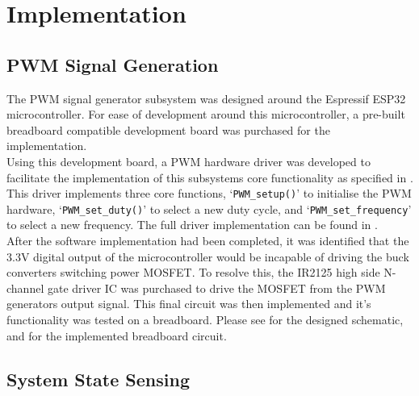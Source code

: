 \chapter{Implementation}\label{C:implementation}


\section{PWM Signal Generation}\label{S:pwm_gen_impl}

The PWM signal generator subsystem was designed around the Espressif ESP32 microcontroller. For ease of development around this microcontroller, a pre-built breadboard compatible development board was purchased for the implementation. \\

Using this development board, a PWM hardware driver was developed to facilitate the implementation of this subsystems core functionality as specified in . This driver implements three core functions, `\lstinline{PWM_setup()}' to initialise the PWM hardware, `\lstinline{PWM_set_duty()}' to select a new duty cycle, and `\lstinline{PWM_set_frequency}' to select a new frequency. The full driver implementation can be found in .\\

After the software implementation had been completed, it was identified that the 3.3V digital output of the microcontroller would be incapable of driving the buck converters switching power MOSFET. To resolve this, the IR2125 high side N-channel gate driver IC was purchased to drive the MOSFET from the PWM generators output signal. This final circuit was then implemented and it's functionality was tested on a breadboard. Please see  for the designed schematic, and  for the implemented breadboard circuit.



\section{System State Sensing}\label{S:current_sense_impl}


